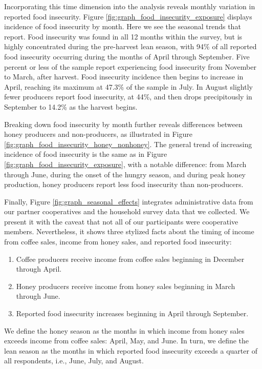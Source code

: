 \documentclass[../main.tex]{subfiles}
\begin{document}
Incorporating this time dimension into the analysis reveals
monthly variation in reported food insecurity.
Figure \ref{fig:graph_food_insecurity_exposure} displays incidence
of food insecurity by month. Here we see the seasonal trends
that \textcite{morrisMesesFlacosSeasonal2013, anderzenEffectsOnfarmDiversification2020}
report. Food insecurity was found in all 12 months within the survey, but is highly concentrated during the pre-harvest lean season, with 94\% of all reported food insecurity occurring during the months of April through September.
Five percent or less of the sample report
experiencing food insecurity from November to March, after harvest. Food insecurity incidence then begins to increase in April, reaching its maximum at 47.3\% of the sample in July. In August slightly fewer producers report food insecurity, at 44\%, and then drops precipitously in September to 14.2\% as the harvest begins. 

Breaking down food insecurity by month further reveals
differences between honey producers and non-producers, as
illustrated in Figure \ref{fig:graph_food_insecurity_honey_nonhoney}. 
The general trend of increasing incidence of food insecurity is the same as in  Figure \ref{fig:graph_food_insecurity_exposure}, with a notable difference: from March through June, during the onset of the hungry season, and during peak honey production, honey producers
report less food insecurity than non-producers. 

Finally, Figure \ref{fig:graph_seasonal_effects} integrates
administrative data from our partner cooperatives and the 
household survey data that we collected. We present it
with the caveat that not all of our participants
were cooperative members. Nevertheless, it shows three
stylized facts about the timing of income from coffee sales,
income from honey sales, and reported food insecurity:
\begin{enumerate}
    \item Coffee producers receive income from coffee sales
    beginning in December through April.
    \item Honey producers receive income from honey sales
    beginning in March through June.
    \item Reported food insecurity increases beginning in April through September.
\end{enumerate}

We define the honey season as the months in which income
from honey sales exceeds income from coffee sales: April, May, and June. In turn, we define the lean season as the months in which
reported food insecurity exceeds a quarter of all respondents, i.e., June, July, and August. 
\end{document}
